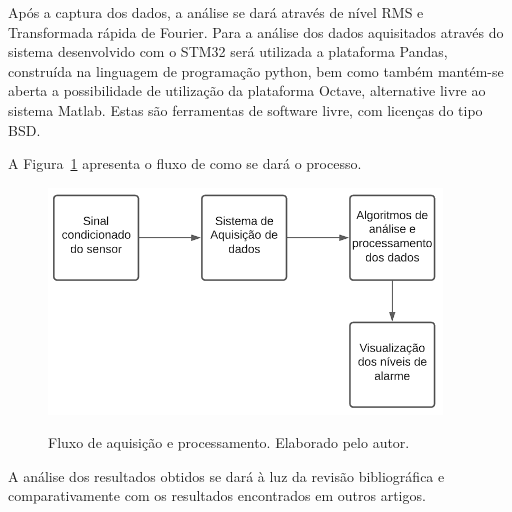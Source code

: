\documentclass[
	12pt,				
	oneside,			
	a4paper,			
	english,			
	brazil,			
	]{abntex2ppgsi}
\begin{document}
Após a captura dos dados, a análise se dará através de nível RMS e Transformada rápida de Fourier. Para a análise dos dados aquisitados através do sistema desenvolvido com o STM32 será utilizada a plataforma Pandas, construída na linguagem de programação python, bem como também mantém-se aberta a possibilidade de utilização da plataforma Octave, alternative livre ao sistema Matlab. Estas são ferramentas de software livre, com licenças do tipo BSD. 

A Figura~\ref{fluxograma_aquisicao} apresenta o fluxo de como se dará o processo.

\begin{figure}[H]
\centering
\caption {Fluxo de aquisição e processamento. Elaborado pelo autor.}
\includegraphics[width=\textwidth,height=60mm,keepaspectratio]{fluxograma_funcionamento_sistema}
\label{fluxograma_aquisicao}
\end{figure} 



A análise dos resultados obtidos se dará à luz da revisão bibliográfica e comparativamente com os resultados encontrados em outros artigos. 

\section{}
\end{document}
